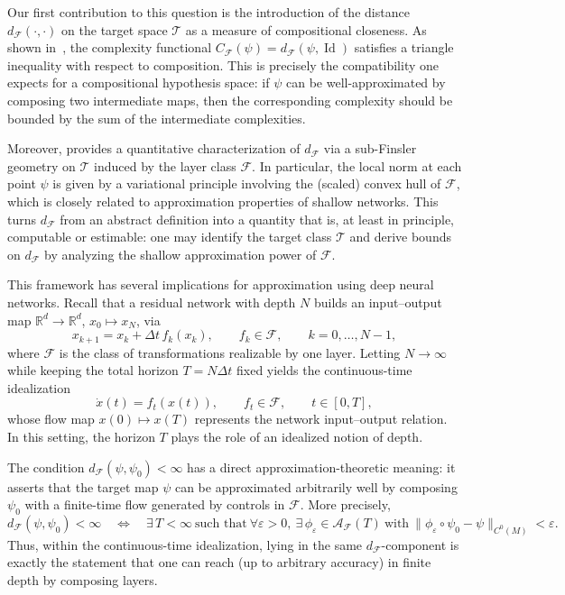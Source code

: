 \documentclass[12pt]{amsart}
\numberwithin{equation}{section}
\theoremstyle{remark}
\begin{document}
Our first contribution to this question is the introduction of the distance $d_{\mathcal F}(\cdot,\cdot)$ on the target space $\mathcal T$ as a measure of compositional closeness. As shown in~, the complexity functional
$C_{\mathcal F}(\psi)=d_{\mathcal F}(\psi,\operatorname{Id})$ satisfies a triangle inequality with respect to composition. This is precisely the compatibility one expects for a compositional hypothesis space: if $\psi$ can be well-approximated by composing two intermediate maps, then the corresponding complexity should be bounded by the sum of the intermediate complexities.

Moreover,  provides a quantitative characterization of $d_{\mathcal F}$ via a sub-Finsler geometry on $\mathcal T$ induced by the layer class $\mathcal F$. In particular, the local norm at each point $\psi$ is given by a variational principle involving the (scaled) convex hull of $\mathcal F$, which is closely related to approximation properties of shallow networks. This turns $d_{\mathcal F}$ from an abstract definition into a quantity that is, at least in principle, computable or estimable: one may identify the target class $\mathcal T$ and derive bounds on $d_{\mathcal F}$ by analyzing the shallow approximation power of $\mathcal F$.

This framework has several implications for approximation using deep neural networks. Recall that a residual network with depth $N$ builds an input--output map $\mathbb{R}^d\to\mathbb{R}^d$, $x_0\mapsto x_N$, via
\begin{equation}
x_{k+1}=x_k+\Delta t\, f_k(x_k),\qquad f_k\in \mathcal F,\qquad k=0,\dots,N-1,
\label{eq:resnet-discrete-interpretation}
\end{equation}
where $\mathcal F$ is the class of transformations realizable by one layer. Letting $N\to\infty$ while keeping the total horizon $T=N\Delta t$ fixed yields the continuous-time idealization
\begin{equation}
\dot x(t)=f_t(x(t)),\qquad f_t\in \mathcal F,\qquad t\in[0,T],
\label{eq:resnet-ode-interpretation}
\end{equation}
whose flow map $x(0)\mapsto x(T)$ represents the network input--output relation. In this setting, the horizon $T$ plays the role of an idealized notion of depth.

The condition $d_{\mathcal F}(\psi,\psi_0)<\infty$ has a direct approximation-theoretic meaning: it asserts that the target map $\psi$ can be approximated arbitrarily well by composing $\psi_0$ with a finite-time flow generated by controls in $\mathcal F$. More precisely,
\begin{equation}
\label{eq:finite-distance-epsilon}
d_{\mathcal F}(\psi,\psi_0)<\infty
\quad\Longleftrightarrow\quad
\exists\,T<\infty\ \text{such that}\ 
\forall \varepsilon>0,\ \exists\,\phi_\varepsilon\in\mathcal A_{\mathcal F}(T)\ \text{with}\ 
\|\phi_\varepsilon\circ\psi_0-\psi\|_{C^0(M)}<\varepsilon .
\end{equation}
Thus, within the continuous-time idealization, lying in the same $d_{\mathcal F}$-component is exactly the statement that one can reach (up to arbitrary accuracy) in finite depth by composing layers.
\end{document}
